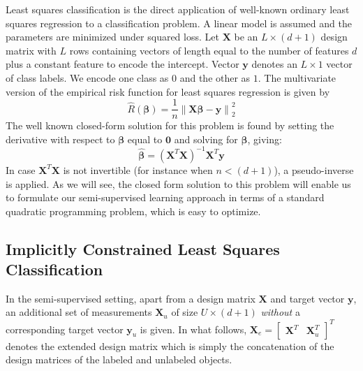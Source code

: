 \documentclass{llncs}
\newcommand{\featdim}{d}
\newcommand{\Nunl}{U}
\newcommand{\Nlab}{L}
\begin{document}
Least squares classification \cite{Hastie2001,Rifkin2003} is the direct application of well-known ordinary least squares regression to a classification problem. A linear model is assumed and the parameters are minimized under squared loss. Let $\mathbf{X}$ be an $\Nlab \times (\featdim+1)$ design matrix with $\Nlab$ rows containing vectors of length equal to the number of features $\featdim$ plus a constant feature to encode the intercept. Vector $\textbf{y}$ denotes an $\Nlab \times 1$ vector of  class labels. We encode one class as $0$ and the other as $1$.  The multivariate version of the empirical risk function for least squares regression is given by
\begin{equation} \label{squaredloss}
\hat{R}(\boldsymbol{\beta}) = \frac{1}{n} \left\|  \mathbf{X} \boldsymbol{\beta}-\mathbf{y} \right\| _2^2
\end{equation}
The well known closed-form solution for this problem is found by setting the derivative with respect to $\boldsymbol{\beta}$ equal to $\textbf{0}$ and solving for $\boldsymbol{\beta}$, giving:
\begin{equation} \label{olssolution}
\boldsymbol{\hat{\beta}}=\left(\mathbf{X}^T \mathbf{X}\right)^{-1} \mathbf{X}^T \mathbf{y}
\end{equation}
In case $\textbf{X}^T \textbf{X}$ is not invertible (for instance when $n<(\featdim+1)$), a pseudo-inverse is applied. As we will see, the closed form solution to this problem will enable us to formulate our semi-supervised learning approach in terms of a standard quadratic programming problem, which is easy to optimize.

\subsection{Implicitly Constrained Least Squares Classification} \label{section:icls}

In the semi-supervised setting, apart from a design matrix $\textbf{X}$ and target vector $\textbf{y}$, an additional set of measurements $\textbf{X}_u$ of size $\Nunl \times (\featdim+1)$ \emph{without} a corresponding target vector $\textbf{y}_u$ is given. In what follows, $\mathbf{X}_e=\begin{bmatrix} \mathbf{X}^T  & \mathbf{X}_u^T \end{bmatrix}^T$ denotes the extended design matrix which is simply the concatenation of the design matrices of the labeled and unlabeled objects.
\end{document}
